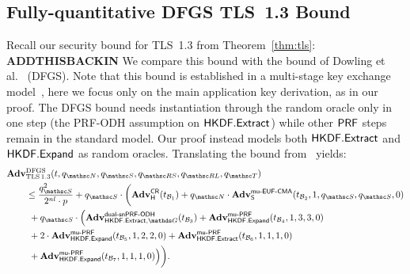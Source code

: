 \subsection{Fully-quantitative DFGS TLS~1.3 Bound}

\label{apx:evaluation:DFGS-bound}

%
Recall our security bound for TLS~1.3 from Theorem~\ref{thm:tls}:
{\color{red}\textbf{ADDTHISBACKIN}}
We compare this bound
with the bound of Dowling et al.~\cite{JC:DFGS21} (DFGS).
Note that this bound is established in a multi-stage key exchange model~\cite{CCS:FisGue14}, here we focus only on the main application key derivation, as in our proof.
The DFGS bound needs instantiation through the random oracle only in one step (the PRF-ODH assumption on $\mathsf{HKDF}.\mathsf{Extract}$) while other $\mathsf{PRF}$ steps remain in the standard model.
Our proof instead models both $\mathsf{HKDF}.\mathsf{Extract}$ and $\mathsf{HKDF}.\mathsf{Expand}$ as random oracles.
Translating the bound from~\cite[Theorems~5.1, 5.2]{JC:DFGS21} yields:
	\begin{align*}
		\Adv&^{\text{DFGS}}_{\mTLS}(t, \qNewUser, \qSend, \qRevSessionKey, \qRevLongTermKey, \qTest)\\
			&\leq 			
			\frac{\qSend^2}{2^{\nl} \cdot p}			%
			+			
			\qSend \cdot						%
			\bigg(
				\Adv^{\COLL}_{\Hash}(t_{\advB_1})				%
				+ \qNewUser \cdot \Adv^{\muEUFCMA}_{\SIGScheme}(t_{\advB_2}, 1, \qSend,\qSend, 0)	%
			\\&~
				+ \qSend \cdot \Big(				%
				\Adv^{\notionstyle{dual{\minus}snPRF{\minus}ODH}}_{\HKDF.\Extract,\group}(t_{\advB_3})		%
				+ \Adv^{\muPRFSEC}_{\HKDF.\Expand}(t_{\advB_4}, 1, 3,3,0)	%
			\\&~
				+ 2 \cdot \Adv^{\muPRFSEC}_{\HKDF.\Expand}(t_{\advB_5}, 1, 2,2,0)	%
				+ \Adv^{\muPRFSEC}_{\HKDF.\Extract}(t_{\advB_6}, 1, 1,1,0)		%
			\\&~
				+ \Adv^{\muPRFSEC}_{\HKDF.\Expand}(t_{\advB_7}, 1, 1,1,0)		%
				\Big)
			\bigg).
	\end{align*}

